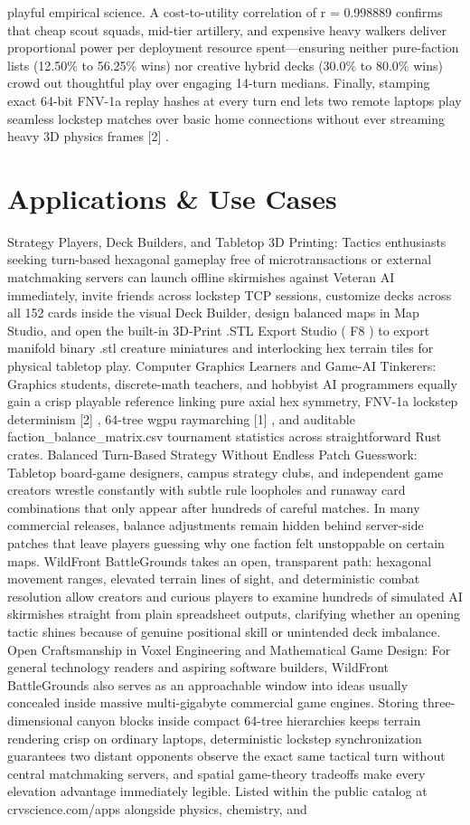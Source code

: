 \documentclass[10pt,letterpaper]{article}
\begin{document}
playful empirical science. A cost-to-utility correlation of r = 0.998889 confirms that cheap scout squads, mid-tier artillery, and expensive heavy walkers deliver proportional power per deployment resource spent---ensuring neither pure-faction lists (12.50\% to 56.25\% wins) nor creative hybrid decks (30.0\% to 80.0\% wins) crowd out thoughtful play over engaging 14-turn medians. Finally, stamping exact 64-bit FNV-1a replay hashes at every turn end lets two remote laptops play seamless lockstep matches over basic home connections without ever streaming heavy 3D physics frames [2] .

\section{Applications \& Use Cases}
Strategy Players, Deck Builders, and Tabletop 3D Printing: Tactics enthusiasts seeking turn-based hexagonal gameplay free of microtransactions or external matchmaking servers can launch offline skirmishes against Veteran AI immediately, invite friends across lockstep TCP sessions, customize decks across all 152 cards inside the visual Deck Builder, design balanced maps in Map Studio, and open the built-in 3D-Print .STL Export Studio ( F8 ) to export manifold binary .stl creature miniatures and interlocking hex terrain tiles for physical tabletop play. Computer Graphics Learners and Game-AI Tinkerers: Graphics students, discrete-math teachers, and hobbyist AI programmers equally gain a crisp playable reference linking pure axial hex symmetry, FNV-1a lockstep determinism [2] , 64-tree wgpu raymarching [1] , and auditable faction\_balance\_matrix.csv tournament statistics across straightforward Rust crates. Balanced Turn-Based Strategy Without Endless Patch Guesswork: Tabletop board-game designers, campus strategy clubs, and independent game creators wrestle constantly with subtle rule loopholes and runaway card combinations that only appear after hundreds of careful matches. In many commercial releases, balance adjustments remain hidden behind server-side patches that leave players guessing why one faction felt unstoppable on certain maps. WildFront BattleGrounds takes an open, transparent path: hexagonal movement ranges, elevated terrain lines of sight, and deterministic combat resolution allow creators and curious players to examine hundreds of simulated AI skirmishes straight from plain spreadsheet outputs, clarifying whether an opening tactic shines because of genuine positional skill or unintended deck imbalance. Open Craftsmanship in Voxel Engineering and Mathematical Game Design: For general technology readers and aspiring software builders, WildFront BattleGrounds also serves as an approachable window into ideas usually concealed inside massive multi-gigabyte commercial game engines. Storing three-dimensional canyon blocks inside compact 64-tree hierarchies keeps terrain rendering crisp on ordinary laptops, deterministic lockstep synchronization guarantees two distant opponents observe the exact same tactical turn without central matchmaking servers, and spatial game-theory tradeoffs make every elevation advantage immediately legible. Listed within the public catalog at crvscience.com/apps alongside physics, chemistry, and 
\end{document}

